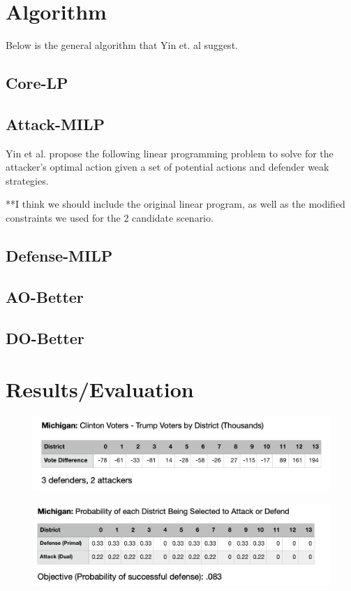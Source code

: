 \documentclass[letterpaper]{article} %
\begin{document}
\section{Algorithm}
Below is the general algorithm that Yin et. al suggest.
\subsection{Core-LP}
\subsection{Attack-MILP}
Yin et al. propose the following linear programming problem to solve for the attacker's optimal action given a set of potential actions and defender weak strategies.

**I think we should include the original linear program, as well as the modified constraints we used for the 2 candidate scenario.

\subsection{Defense-MILP}
\subsection{AO-Better}
\subsection{DO-Better}


\section{Results/Evaluation}

\begin{figure}
    \includegraphics[width=\linewidth]{michigan_votes}
    \label{michigan_votes}
\end{figure}

\begin{figure}
    \includegraphics[width=\linewidth]{michigan_probs}
    \label{michigan_probs}
\end{figure}
\end{document}
